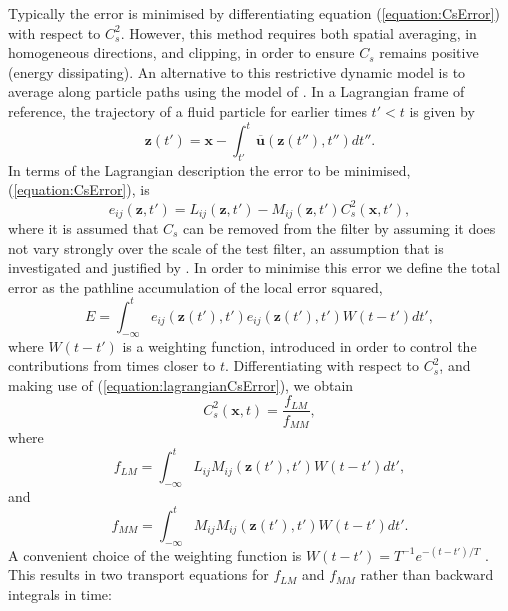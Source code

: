 \documentclass[12pt,oneside,a4paper]{article}
\newcommand{\vect}[1]{\boldsymbol{#1}}
\begin{document}
Typically the error is minimised by differentiating equation (\ref{equation:CsError}) with respect to $C_s^2$. However, this method requires both spatial averaging, in homogeneous directions, and clipping, in order to ensure $C_s$ remains positive (energy dissipating). An alternative to this restrictive dynamic model is to average along particle paths using the model of \cite{meneveau1996}. In a Lagrangian frame of reference, the trajectory of a fluid particle for earlier times $t'<t$ is given by
\begin{equation}
\label{equation:particlePath}
\vect{z}(t') = \vect{x} - \int_{t'}^t \overline{\vect{u}}(\vect{z}(t''),t'')dt''.
\end{equation}
In terms of the Lagrangian description the error to be minimised, (\ref{equation:CsError}), is
\begin{equation}
\label{equation:lagrangianCsError}
e_{ij}(\vect{z},t') = 	L_{ij}(\vect{z},t') - M_{ij}(\vect{z},t')C_s^2(\vect{x},t'),
\end{equation}
where it is assumed that $C_s$ can be removed from the filter by assuming it does not vary strongly over the scale of the test filter, an assumption that is investigated and justified by \cite{meneveau1996}. In order to minimise this error we define the total error as the pathline accumulation of the local error squared, 
\begin{equation}
\label{equation:ErrorSquared}
E = \int_{-\infty}^t e_{ij}(\textbf{z}(t'),t')e_{ij}(\textbf{z}(t'),t') W(t-t') dt',
\end{equation}
where $W(t-t')$ is a weighting function, introduced in order to control the contributions from times closer to $t$. Differentiating with respect to $C_s^2$, and making use of (\ref{equation:lagrangianCsError}), we obtain
\begin{equation}
\label{equation:CsFlmFmm}
C_s^2(\vect{x},t) = \frac{f_{LM}}{f_{MM}},
\end{equation}
where
\begin{equation}
\label{equation:flm}
f_{LM} = \int_{-\infty}^t L_{ij}M_{ij}(\vect{z}(t'),t') W(t-t') dt',
\end{equation}
and
\begin{equation}
\label{equation:fmm}
f_{MM} = \int_{-\infty}^t M_{ij}M_{ij}(\vect{z}(t'),t') W(t-t') dt'.
\end{equation}
A convenient choice of the weighting function is $W(t-t')=T^{-1} e^{-(t-t')/T}$ \citep{meneveau1996}. This results in two transport equations for $f_{LM}$ and $f_{MM}$ rather than backward integrals in time:
\end{document}
